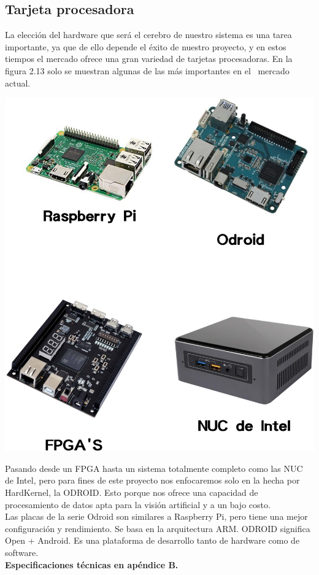 \subsection{Tarjeta procesadora}
La elección del hardware que será el cerebro de nuestro sistema es una tarea importante, ya que de ello depende el éxito de
nuestro proyecto, y en estos tiempos el mercado ofrece una gran variedad de tarjetas procesadoras. En la figura 2.13 solo se muestran algunas de las más importantes en el 
mercado actual.

\begin{center}
	\includegraphics[width=0.60 \textwidth]{Contenido/Cuerpo/Capitulo2/Fig7.eps}
	\label{fig:MarcoTeorico:Fig12}
\end{center}
Pasando desde un FPGA hasta un sistema totalmente completo como las NUC de Intel, pero para fines de este proyecto nos enfocaremos
solo en la hecha por HardKernel, la ODROID. Esto porque nos ofrece una capacidad de procesamiento de datos apta para la visión
artificial y a un bajo costo.\\
Las placas de la serie Odroid son similares a Raspberry Pi, pero tiene una mejor
configuración y rendimiento. Se basa en la arquitectura ARM. \cite{Book:Lentin2018}
ODROID significa Open + Android. Es una plataforma de desarrollo tanto de
hardware como de software.\\
\textbf{Especificaciones técnicas en apéndice B.} \\
